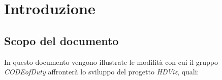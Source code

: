 \section{Introduzione}
\subsection{Scopo del documento}
In questo documento vengono illustrate le modilità con cui il gruppo \emph{CODEofDuty} affronterà lo sviluppo del progetto \emph{HDViz}, quali: